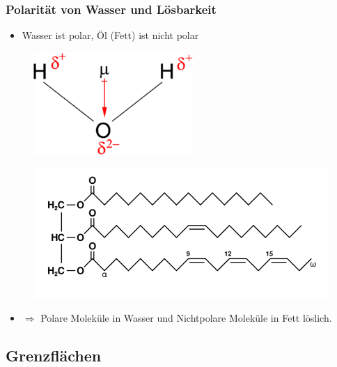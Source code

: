 \documentclass{beamer} %
\begin{document}
\begin{frame}
\frametitle{Polarität von Wasser und Lösbarkeit}
\begin{itemize}
	\item Wasser ist polar, Öl (Fett) ist nicht polar
\end{itemize}\pause
\begin{minipage}[h]{0.49\textwidth}
	\begin{figure}[h]
		\centering
		\includegraphics[width=0.8\linewidth]{water.png}
	\end{figure}
\end{minipage}
\begin{minipage}[h]{0.49\textwidth}
	\begin{figure}[h]
		\centering
		\includegraphics[width=\linewidth]{fett.png}
	\end{figure}
\end{minipage}
\begin{itemize}
	\item $\Rightarrow$ Polare Moleküle in Wasser und Nichtpolare Moleküle in Fett löslich. 
\end{itemize}
\end{frame}

\subsection{Grenzflächen}
\end{document}
